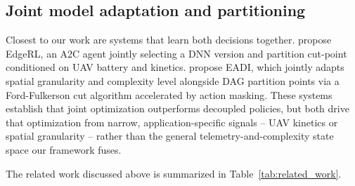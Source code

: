 \documentclass[conference]{IEEEtran}
\begin{document}
\subsection{Joint model adaptation and partitioning}
Closest to our work are systems that learn both decisions together. \citet{mounesan2024edgerl} propose EdgeRL, an A2C agent jointly selecting a DNN version and partition cut-point conditioned on UAV battery and kinetics. \citet{liu2026reinforcement} propose EADI, which jointly adapts spatial granularity and complexity level alongside DAG partition points via a Ford-Fulkerson cut algorithm accelerated by action masking. These systems establish that joint optimization outperforms decoupled policies, but both drive that optimization from narrow, application-specific signals -- UAV kinetics or spatial granularity -- rather than the general telemetry-and-complexity state space our framework fuses.

The related work discussed above is summarized in Table~\ref{tab:related_work}.
\end{document}
